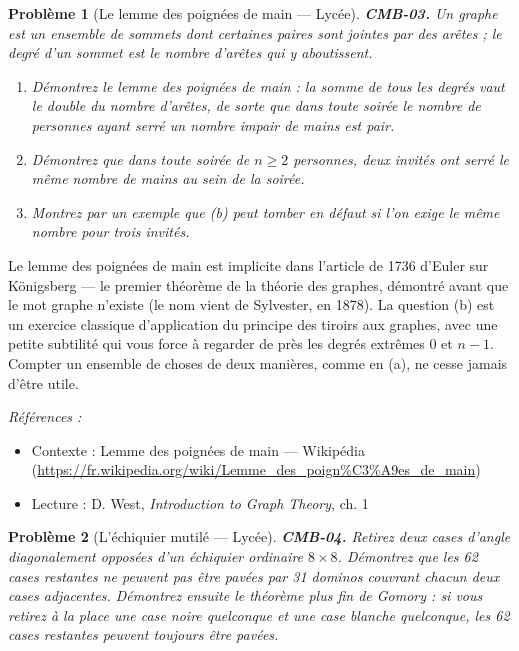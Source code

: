 \documentclass[11pt]{article}
\newtheorem{problem}{Problème}
\newenvironment{refs}{\par\small\noindent\emph{Références :}\begin{itemize}\setlength\itemsep{0pt}}{\end{itemize}\normalsize}
\begin{document}
\begin{problem}[{Le lemme des poignées de main --- Lycée}]
\textbf{CMB-03.} Un graphe est un ensemble de sommets dont certaines paires sont jointes par
des arêtes ; le degré d'un sommet est le nombre d'arêtes qui y aboutissent.
\begin{enumerate}
\item[(a)] Démontrez le lemme des poignées de main : la somme de tous les degrés vaut le double du
nombre d'arêtes, de sorte que dans toute soirée le nombre de personnes ayant serré un nombre
impair de mains est pair.
\item[(b)] Démontrez que dans toute soirée de $ n \ge 2 $ personnes, deux invités ont serré le même
nombre de mains au sein de la soirée.
\item[(c)] Montrez par un exemple que (b) peut tomber en défaut si l'on exige le \og{} même nombre \fg{} pour
\textit{trois} invités.
\end{enumerate}

\end{problem}

\noindent Le lemme des poignées de main est implicite dans l'article de 1736 d'Euler sur
Königsberg --- le premier théorème de la théorie des graphes, démontré avant que le mot \og{} graphe \fg{}
n'existe (le nom vient de Sylvester, en 1878). La question (b) est un exercice classique
d'application du principe des tiroirs aux graphes, avec une petite subtilité qui vous force à
regarder de près les degrés extrêmes 0 et $ n-1 $. Compter un ensemble de choses de deux
manières, comme en (a), ne cesse jamais d'être utile.

\begin{refs}
\item Contexte : Lemme des poignées de main --- Wikipédia (\url{https://fr.wikipedia.org/wiki/Lemme_des_poign%C3%A9es_de_main})
\item Lecture : D. West, \textit{Introduction to Graph Theory}, ch. 1
\end{refs}

\bigskip

\begin{problem}[{L'échiquier mutilé --- Lycée}]
\textbf{CMB-04.} Retirez deux cases d'angle diagonalement opposées d'un
échiquier ordinaire $ 8 \times 8 $. Démontrez que les 62 cases restantes ne peuvent pas être
pavées par 31 dominos couvrant chacun deux cases adjacentes. Démontrez ensuite le théorème plus
fin de Gomory : si vous retirez à la place une case noire quelconque et une case blanche
quelconque, les 62 cases restantes \textit{peuvent} toujours être pavées.
\end{problem}
\end{document}
